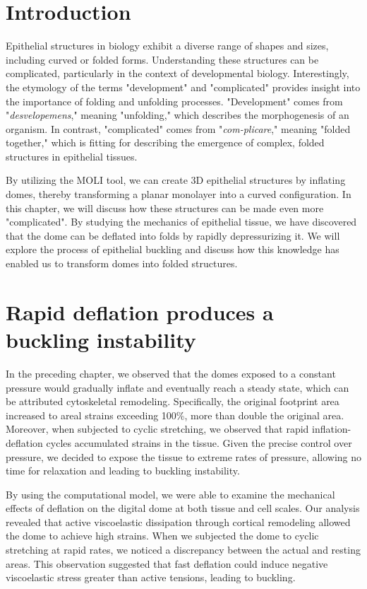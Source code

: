 \hypertarget{introduction}{%
\section{Introduction}\label{introduction5}}

Epithelial structures in biology exhibit a diverse range of shapes and sizes, including curved or folded forms. Understanding these structures can be complicated, particularly in the context of developmental biology. Interestingly, the etymology of the terms "development" and "complicated" provides insight into the importance of folding and unfolding processes. "Development" comes from "\textit{desvelopemens}," meaning "unfolding," which describes the morphogenesis of an organism. In contrast, "complicated" comes from "\textit{com-plicare}," meaning "folded together," which is fitting for describing the emergence of complex, folded structures in epithelial tissues.

By utilizing the MOLI tool, we can create 3D epithelial structures by inflating domes, thereby transforming a planar monolayer into a curved configuration. In this chapter, we will discuss how these structures can be made even more "complicated". By studying the mechanics of epithelial tissue, we have discovered that the dome can be deflated into folds by rapidly depressurizing it. We will explore the process of epithelial buckling and discuss how this knowledge has enabled us to transform domes into folded structures.

\hypertarget{rapid-deflation-produces-a-buckling-instability}{%
	\section{Rapid deflation produces a buckling
		instability}\label{rapid-deflation-produces-a-buckling-instability}}

In the preceding chapter, we observed that the domes exposed to a constant pressure would gradually inflate and eventually reach a steady state, which can be attributed cytoskeletal remodeling. Specifically, the original footprint area increased to areal strains exceeding 100\%, more than double the original area. Moreover, when subjected to cyclic stretching, we observed that rapid inflation-deflation cycles accumulated strains in the tissue. Given the precise control over pressure, we decided to expose the tissue to extreme rates of pressure, allowing no time for relaxation and leading to buckling instability.

By using the computational model, we were able to examine the mechanical effects of deflation on the digital dome at both tissue and cell scales. Our analysis revealed that active viscoelastic dissipation through cortical remodeling allowed the dome to achieve high strains. When we subjected the dome to cyclic stretching at rapid rates, we noticed a discrepancy between the actual and resting areas. This observation suggested that fast deflation could induce negative viscoelastic stress greater than active tensions, leading to buckling.

